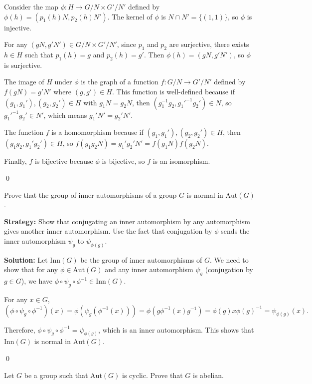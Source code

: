 Consider the map $\phi: H \to G/N \times G'/N'$ defined by $\phi(h) = (p_1(h)N, p_2(h)N')$. The kernel of $\phi$ is $N \cap N' = \{(1,1)\}$, so $\phi$ is injective.

For any $(gN, g'N') \in G/N \times G'/N'$, since $p_1$ and $p_2$ are surjective, there exists $h \in H$ such that $p_1(h) = g$ and $p_2(h) = g'$. Then $\phi(h) = (gN, g'N')$, so $\phi$ is surjective.

The image of $H$ under $\phi$ is the graph of a function $f: G/N \to G'/N'$ defined by $f(gN) = g'N'$ where $(g,g') \in H$. This function is well-defined because if $(g_1,g_1'), (g_2,g_2') \in H$ with $g_1N = g_2N$, then $(g_1^{-1}g_2, g_1'^{-1}g_2') \in N$, so $g_1'^{-1}g_2' \in N'$, which means $g_1'N' = g_2'N'$.

The function $f$ is a homomorphism because if $(g_1,g_1'), (g_2,g_2') \in H$, then $(g_1g_2, g_1'g_2') \in H$, so $f(g_1g_2N) = g_1'g_2'N' = f(g_1N)f(g_2N)$.

Finally, $f$ is bijective because $\phi$ is bijective, so $f$ is an isomorphism.


\qed
\begin{problembox}
Prove that the group of inner automorphisms of a group $G$ is normal in $\text{Aut}(G)$.
\end{problembox}

\noindent\textbf{Strategy:} Show that conjugating an inner automorphism by any automorphism gives another inner automorphism. Use the fact that conjugation by $\phi$ sends the inner automorphism $\psi_g$ to $\psi_{\phi(g)}$.

\noindent\textbf{Solution:} Let $\text{Inn}(G)$ be the group of inner automorphisms of $G$. We need to show that for any $\phi \in \text{Aut}(G)$ and any inner automorphism $\psi_g$ (conjugation by $g \in G$), we have $\phi \circ \psi_g \circ \phi^{-1} \in \text{Inn}(G)$.

For any $x \in G$,
\[(\phi \circ \psi_g \circ \phi^{-1})(x) = \phi(\psi_g(\phi^{-1}(x))) = \phi(g\phi^{-1}(x)g^{-1}) = \phi(g)x\phi(g)^{-1} = \psi_{\phi(g)}(x).\]

Therefore, $\phi \circ \psi_g \circ \phi^{-1} = \psi_{\phi(g)}$, which is an inner automorphism. This shows that $\text{Inn}(G)$ is normal in $\text{Aut}(G)$.


\qed
\begin{problembox}
Let $G$ be a group such that $\text{Aut}(G)$ is cyclic. Prove that $G$ is abelian.
\end{problembox}

